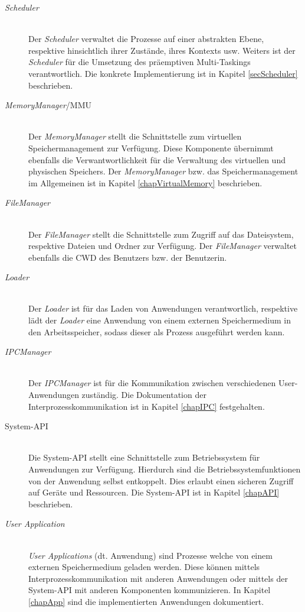 \begin{description}
	\item[\textit{Scheduler}] \hfill \\
	Der \textit{Scheduler} verwaltet die Prozesse auf einer abstrakten Ebene, respektive hinsichtlich ihrer Zustände, ihres Kontexts usw. Weiters ist der \textit{Scheduler} für die Umsetzung des präemptiven Multi-Taskings verantwortlich. Die konkrete Implementierung ist in Kapitel \ref{secScheduler} beschrieben.
	
	\item[\textit{MemoryManager}/\ac{MMU}] \hfill \\
	Der \textit{MemoryManager} stellt die Schnittstelle zum virtuellen Speichermanagement zur Verfügung. Diese Komponente übernimmt ebenfalls die Verwantwortlichkeit für die Verwaltung des virtuellen und physischen Speichers. Der \textit{MemoryManager} bzw. das Speichermanagement im Allgemeinen ist in Kapitel \ref{chapVirtualMemory} beschrieben.

	\item[\textit{FileManager}] \hfill \\
	Der \textit{FileManager} stellt die Schnittstelle zum Zugriff auf das Dateisystem, respektive Dateien und Ordner zur Verfügung. Der \textit{FileManager} verwaltet ebenfalls die \ac{CWD} des Benutzers bzw. der Benutzerin.
	
	\item[\textit{Loader}] \hfill \\
	Der \textit{Loader} ist für das Laden von Anwendungen verantwortlich, respektive lädt der \textit{Loader} eine Anwendung von einem externen Speichermedium in den Arbeitsspeicher, sodass dieser als Prozess ausgeführt werden kann.
	
	\item[\textit{IPCManager}] \hfill \\
	Der \textit{IPCManager} ist für die Kommunikation zwischen verschiedenen User-Anwendungen zuständig. Die Dokumentation der Interprozesskommunikation ist in Kapitel \ref{chapIPC} festgehalten.
	
	\item[System-API] \hfill \\
	Die System-API stellt eine Schnittstelle zum Betriebssystem für Anwendungen zur Verfügung. Hierdurch sind die Betriebssystemfunktionen von der Anwendung selbst entkoppelt. Dies erlaubt einen sicheren Zugriff auf Geräte und Ressourcen. Die System-API ist in Kapitel \ref{chapAPI} beschrieben.
	
	\item[\textit{User Application}] \hfill \\
	\textit{User Applications} (dt. Anwendung) sind Prozesse welche von einem externen Speichermedium geladen werden. Diese können mittels Interprozesskommunikation mit anderen Anwendungen oder mittels der System-API mit anderen Komponenten kommunizieren. In Kapitel \ref{chapApp} sind die implementierten Anwendungen dokumentiert.
	

\end{description}
